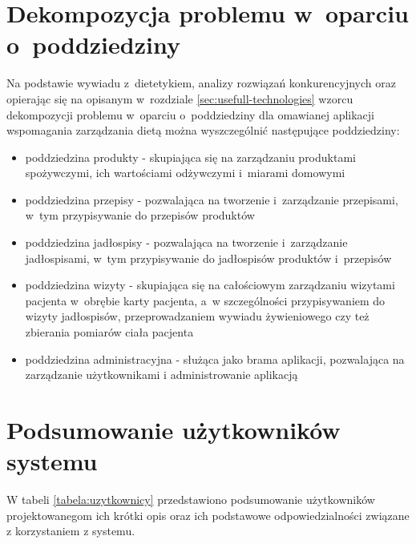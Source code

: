 \section{Dekompozycja problemu w~oparciu o~poddziedziny}\label{sec:problem-decomposition}
\par
Na podstawie wywiadu z~dietetykiem, analizy rozwiązań konkurencyjnych oraz opierając się
na opisanym w~rozdziale \ref{sec:usefull-technologies} wzorcu dekompozycji problemu w~oparciu o~poddziedziny
dla omawianej aplikacji wspomagania zarządzania dietą można wyszczególnić następujące poddziedziny:
\begin{itemize}
    \item poddziedzina produkty - skupiająca się na zarządzaniu produktami spożywczymi, ich wartościami odżywczymi i~miarami domowymi
    \item poddziedzina przepisy - pozwalająca na tworzenie i~zarządzanie przepisami, w~tym przypisywanie do przepisów produktów
    \item poddziedzina jadłospisy - pozwalająca na tworzenie i~zarządzanie jadłospisami, w~tym przypisywanie do jadłospisów produktów i~przepisów
    \item poddziedzina wizyty - skupiająca się na całościowym zarządzaniu wizytami pacjenta w~obrębie karty pacjenta, a~w szczególności przypisywaniem do wizyty jadłospisów, przeprowadzaniem wywiadu żywieniowego czy też zbierania pomiarów ciała pacjenta
    \item poddziedzina administracyjna - służąca jako brama aplikacji, pozwalająca na zarządzanie użytkownikami i administrowanie aplikacją
\end{itemize}

\section{Podsumowanie użytkowników systemu}\label{sec:users-summary}
\par
W tabeli \ref{tabela:uzytkownicy} przedstawiono podsumowanie użytkowników projektowanegom ich krótki opis oraz ich podstawowe odpowiedzialności związane z korzystaniem z systemu.

